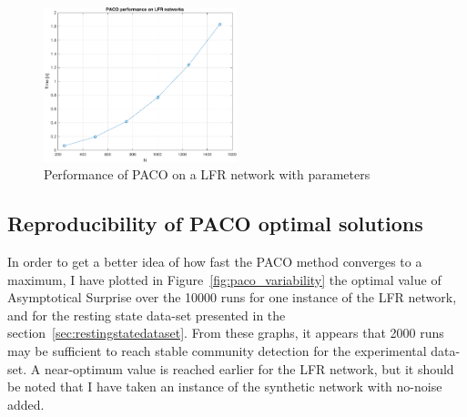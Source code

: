 \begin{figure}[!htb]
\centering
\includegraphics[width=0.5\textwidth]{images/paco_benchmark.pdf}
\caption{Performance of PACO on a LFR network with parameters}
\label{fig:paco_benchmark}
\end{figure}

\subsection{Reproducibility of PACO optimal solutions}
In order to get a better idea of how fast the PACO method converges to a maximum, I have plotted in Figure~\ref{fig:paco_variability} the optimal value of Asymptotical Surprise over the 10000 runs for one instance of the LFR network, and for the resting state data-set presented in the section~\ref{sec:restingstatedataset}.
From these graphs, it appears that 2000 runs may be sufficient to reach stable community detection for the experimental data-set.
A near-optimum value is reached earlier for the LFR network, but it should be noted that I have taken an instance of the synthetic network with no-noise added.

